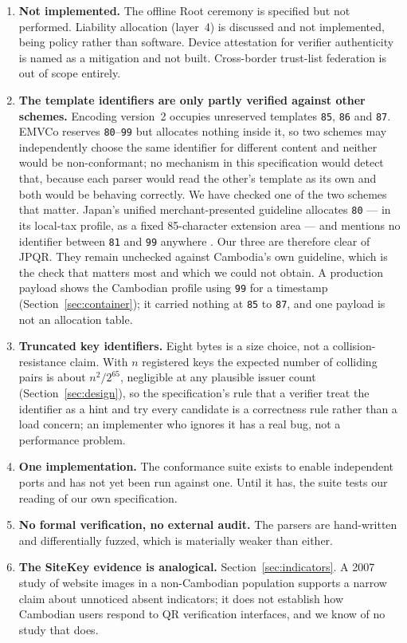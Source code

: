 \documentclass[10pt,a4paper,twocolumn]{article}
\newcommand{\code}[1]{\texttt{\small #1}}
\begin{document}
\begin{enumerate}[leftmargin=1.6em]
  \item \textbf{Not implemented.} The offline Root ceremony is specified but not
    performed. Liability allocation (layer~4) is discussed and not implemented,
    being policy rather than software. Device attestation for verifier
    authenticity is named as a mitigation and not built. Cross-border trust-list
    federation is out of scope entirely.

  \item \textbf{The template identifiers are only partly verified against other
    schemes.} Encoding version~2 occupies unreserved templates \code{85},
    \code{86} and \code{87}. EMVCo reserves \code{80}--\code{99} but allocates
    nothing inside it, so two schemes may independently choose the same
    identifier for different content and neither would be non-conformant; no
    mechanism in this specification would detect that, because each parser would
    read the other's template as its own and both would be behaving correctly.
    We have checked one of the two schemes that matter. Japan's unified
    merchant-presented guideline allocates \code{80} --- in its local-tax
    profile, as a fixed 85-character extension area --- and mentions no
    identifier between \code{81} and \code{99} anywhere
    \citep{jpqrmpm}. Our three are therefore clear of JPQR. They remain
    unchecked against Cambodia's own guideline, which is the check that matters
    most and which we could not obtain. A production payload shows the
    Cambodian profile using \code{99} for a timestamp
    (Section~\ref{sec:container}); it carried nothing at \code{85} to
    \code{87}, and one payload is not an allocation table.

  \item \textbf{Truncated key identifiers.} Eight bytes is a size choice, not a
    collision-resistance claim. With $n$ registered keys the expected number
    of colliding pairs is about $n^2/2^{65}$, negligible at any plausible
    issuer count (Section~\ref{sec:design}), so the specification's rule that
    a verifier treat the identifier as a hint and try every candidate is a
    correctness rule rather than a load concern; an implementer who ignores
    it has a real bug, not a performance problem.

  \item \textbf{One implementation.} The conformance suite exists to enable
    independent ports and has not yet been run against one. Until it has, the
    suite tests our reading of our own specification.

  \item \textbf{No formal verification, no external audit.} The parsers are
    hand-written and differentially fuzzed, which is materially weaker than
    either.

  \item \textbf{The SiteKey evidence is analogical.}
    Section~\ref{sec:indicators}. A 2007 study of website images in a
    non-Cambodian population supports a narrow claim about unnoticed absent
    indicators; it does not establish how Cambodian users respond to QR
    verification interfaces, and we know of no study that does.
\end{enumerate}
\end{document}
